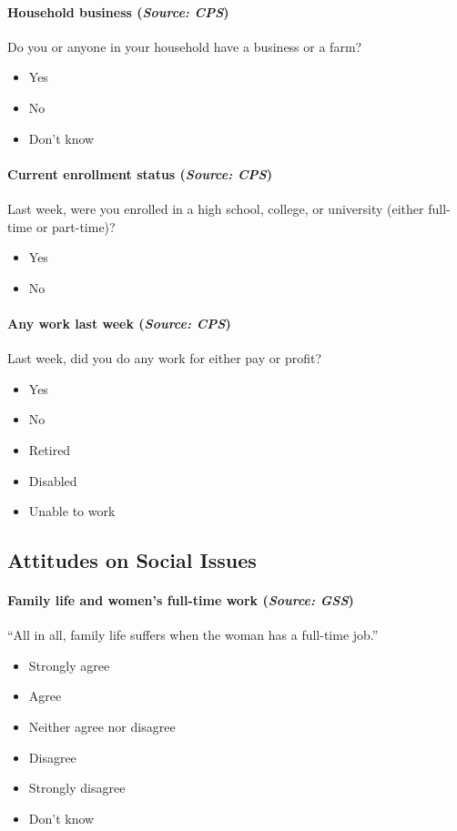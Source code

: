 \documentclass[letterpaper,12pt]{article}
\theoremstyle{proposition}
\begin{document}
\paragraph{Household business (\textit{Source: CPS})}
Do you or anyone in your household have a business or a farm?
\begin{itemize}[itemsep=-10pt,topsep=0pt]
\item Yes
\item No
\item Don’t know
\end{itemize}

\paragraph{Current enrollment status (\textit{Source: CPS})}
Last week, were you enrolled in a high school, college, or university (either full-time or part-time)?
\begin{itemize}[itemsep=-10pt,topsep=0pt]
\item Yes
\item No
\end{itemize}

\paragraph{Any work last week (\textit{Source: CPS})}
Last week, did you do any work for either pay or profit?
\begin{itemize}[itemsep=-10pt,topsep=0pt]
\item Yes
\item No
\item Retired
\item Disabled
\item Unable to work
\end{itemize}


\subsection*{Attitudes on Social Issues}

\paragraph{Family life and women’s full-time work (\textit{Source: GSS})}
“All in all, family life suffers when the woman has a full-time job.”
\begin{itemize}[itemsep=-10pt,topsep=0pt]
\item Strongly agree
\item Agree
\item Neither agree nor disagree
\item Disagree
\item Strongly disagree
\item Don’t know
\end{itemize}
\end{document}
